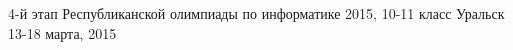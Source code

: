 \documentclass [11pt, a4paper, oneside] {article}
\begin{document}
\contest
{4-й этап Республиканской олимпиады по информатике 2015, 10-11 класс}%
{Уральск}%
{13-18 марта, 2015}%


\renewcommand{\t}{\texttt}
\end{document}
